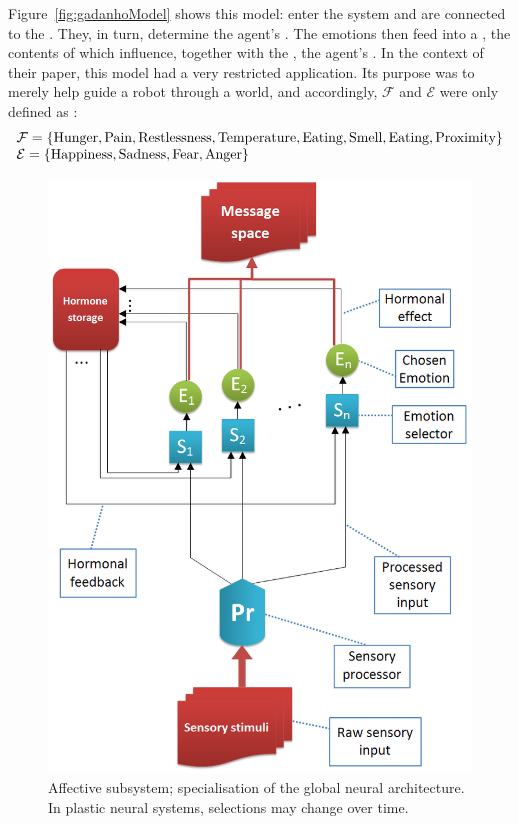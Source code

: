 \documentclass[]{scrartcl}
\theoremstyle{break}
\newcommand{\mt}[1]{\textnormal{#1}}
\begin{document}
Figure~\ref{fig:gadanhoModel} shows this model:  enter the system and are connected to the . They, in turn, determine the agent's . The emotions then feed into a , the contents of which influence, together with the , the agent's . In the context of their paper, this model had a very restricted application. Its purpose was to merely help guide a robot through a world, and accordingly, $\mathcal{F}$ and $\mathcal{E}$ were only defined as \cite[p. 47]{DBLP:journals/adb/GadanhoH01}:
$$
	\begin{array}{l}
		\mathcal{F} = \{ \mt{Hunger}, \mt{Pain}, \mt{Restlessness},
						 \mt{Temperature}, \mt{Eating}, \mt{Smell},
						 \mt{Eating}, \mt{Proximity} \}\\
		\mathcal{E} = \{ \mt{Happiness}, \mt{Sadness}, \mt{Fear},
						 \mt{Anger} \}
	\end{array}
$$

\begin{figure}[!h]
	\centering
	\includegraphics[width=400pt]{figs/affectiveSubsystem.png}
	\caption{Affective subsystem; specialisation of the global neural architecture. In plastic neural systems, selections may change over time.}
	\label{fig:affectiveSubsystem}
\end{figure}
\end{document}
